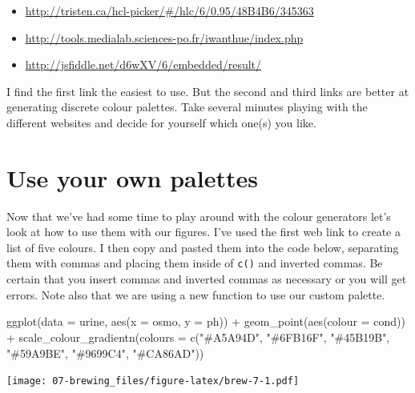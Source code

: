 \documentclass[
]{book}
\newenvironment{Shaded}{\begin{snugshade}}{\end{snugshade}}
\newcommand{\AttributeTok}[1]{\textcolor[rgb]{0.77,0.63,0.00}{#1}}
\newcommand{\FunctionTok}[1]{\textcolor[rgb]{0.00,0.00,0.00}{#1}}
\newcommand{\NormalTok}[1]{#1}
\newcommand{\SpecialCharTok}[1]{\textcolor[rgb]{0.00,0.00,0.00}{#1}}
\newcommand{\StringTok}[1]{\textcolor[rgb]{0.31,0.60,0.02}{#1}}
\providecommand{\tightlist}{%
  \setlength{\itemsep}{0pt}\setlength{\parskip}{0pt}}
\begin{document}
\begin{itemize}
\tightlist
\item
  \url{http://tristen.ca/hcl-picker/\#/hlc/6/0.95/48B4B6/345363}
\item
  \url{http://tools.medialab.sciences-po.fr/iwanthue/index.php}
\item
  \url{http://jsfiddle.net/d6wXV/6/embedded/result/}
\end{itemize}

I find the first link the easiest to use. But the second and third links are better at generating discrete colour palettes. Take several minutes playing with the different websites and decide for yourself which one(s) you like.

\hypertarget{use-your-own-palettes}{%
\section{Use your own palettes}\label{use-your-own-palettes}}

Now that we've had some time to play around with the colour generators let's look at how to use them with our figures. I've used the first web link to create a list of five colours. I then copy and pasted them into the code below, separating them with commas and placing them inside of \texttt{c()} and inverted commas. Be certain that you insert commas and inverted commas as necessary or you will get errors. Note also that we are using a new function to use our custom palette.

\begin{Shaded}
\begin{Highlighting}[]
\FunctionTok{ggplot}\NormalTok{(}\AttributeTok{data =}\NormalTok{ urine, }\FunctionTok{aes}\NormalTok{(}\AttributeTok{x =}\NormalTok{ osmo, }\AttributeTok{y =}\NormalTok{ ph)) }\SpecialCharTok{+}
  \FunctionTok{geom\_point}\NormalTok{(}\FunctionTok{aes}\NormalTok{(}\AttributeTok{colour =}\NormalTok{ cond)) }\SpecialCharTok{+}
  \FunctionTok{scale\_colour\_gradientn}\NormalTok{(}\AttributeTok{colours =} \FunctionTok{c}\NormalTok{(}\StringTok{"\#A5A94D"}\NormalTok{, }\StringTok{"\#6FB16F"}\NormalTok{, }\StringTok{"\#45B19B"}\NormalTok{,}
                                    \StringTok{"\#59A9BE"}\NormalTok{, }\StringTok{"\#9699C4"}\NormalTok{, }\StringTok{"\#CA86AD"}\NormalTok{))}
\end{Highlighting}
\end{Shaded}

\texttt{[image: 07-brewing\_files/figure-latex/brew-7-1.pdf]}
\end{document}
